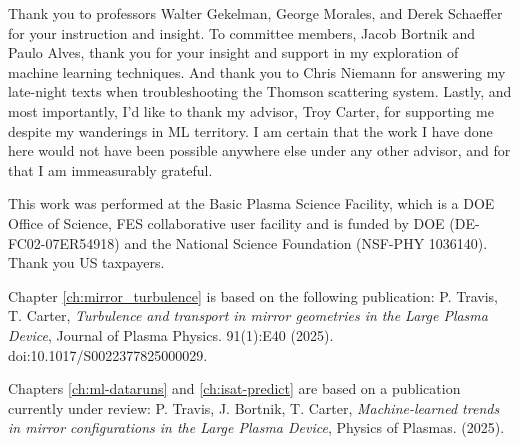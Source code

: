 {Thank you to professors Walter Gekelman, George Morales, and Derek Schaeffer for your instruction and insight.
To committee members, Jacob Bortnik and Paulo Alves, thank you for your insight and support in my exploration of machine learning techniques. And thank you to Chris Niemann for answering my late-night texts when troubleshooting the Thomson scattering system.
Lastly, and most importantly, I'd like to thank my advisor, Troy Carter, for supporting me despite my wanderings in ML territory. I am certain that the work I have done here would not have been possible anywhere else under any other advisor, and for that I am immeasurably grateful. 

This work was performed at the Basic Plasma Science Facility, which is a DOE Office of Science, FES collaborative user facility and is funded by DOE (DE-FC02-07ER54918) and the National Science Foundation (NSF-PHY 1036140). Thank you US taxpayers.

Chapter \ref{ch:mirror_turbulence} is based on the following publication: P. Travis, T. Carter, \emph{Turbulence and transport in mirror geometries in the Large Plasma Device}, Journal of Plasma Physics. 91(1):E40 (2025). doi:10.1017/S0022377825000029.

Chapters \ref{ch:ml-dataruns} and \ref{ch:isat-predict} are based on a publication currently under review: P. Travis, J. Bortnik, T. Carter, \emph{Machine-learned trends in mirror configurations in the Large Plasma
Device}, Physics of Plasmas. (2025).

}






